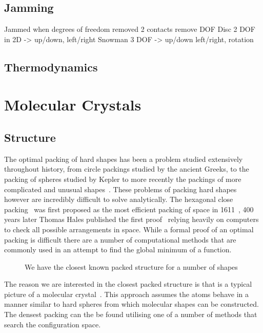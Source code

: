 \subsection{Jamming}
Jammed when degrees of freedom removed
2 contacts remove DOF
Disc 2 DOF in 2D -> up/down, left/right
Snowman 3 DOF -> up/down left/right, rotation

\subsection{Thermodynamics}


\section{Molecular Crystals}
\subsection{Structure}

The optimal packing of hard shapes has been a problem studied extensively throughout history, from circle packings studied by the ancient Greeks, to the packing of spheres studied by Kepler to more recently the packings of more complicated and unusual shapes~\cite{atkinson:12,torquato:12}. These problems of packing hard shapes however are incredibly difficult to solve analytically. The hexagonal close packing~ was first proposed as the most efficient packing of space in 1611~\cite{kepler:1611}, 400 years later Thomas Hales published the first proof~\cite{hales:05,hales:14} relying heavily on computers to check all possible arrangements in space. While a formal proof of an optimal packing is difficult there are a number of computational methods that are commonly used in an attempt to find the global minimum of a function.

\begin{figure}
    \caption{We have the closest known packed structure for a number of shapes}
    \label{fig:hcp}
\end{figure}


The reason we are interested in the closest packed structure is that is a typical picture of a molecular crystal~\cite{kitaigorodskii:73}. This approach assumes the atoms behave in a manner similar to hard spheres from which molecular shapes can be constructed. The densest packing can the be found utilising one of a number of methods that search the configuration space. 

